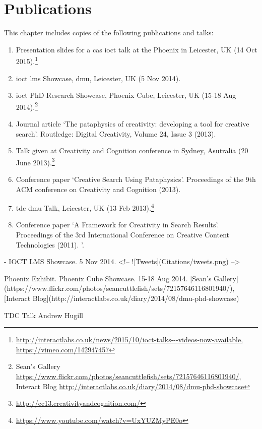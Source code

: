 
\chapter{Publications}
\label{app:pub}

This chapter includes copies of the following publications and talks:


\begin{enumerate}
  \item Presentation slides for a \gls{cas} \gls{ioct} talk at the Phoenix in Leicester, UK (14 Oct 2015).\footnote{\url{http://interactlabs.co.uk/news/2015/10/ioct-talks---videos-now-available}, \url{https://vimeo.com/142947457}}
  \item \gls{ioct} \gls{lms} Showcase, \gls{dmu}, Leicester, UK (5 Nov 2014).
  \item \gls{ioct} PhD Research Showcase, Phoenix Cube, Leicester, UK (15-18 Aug 2014).\footnote{Sean's Gallery \url{https://www.flickr.com/photos/seancuttlefish/sets/72157646116801940/}, Interact Blog \url{http://interactlabs.co.uk/diary/2014/08/dmu-phd-showcase}}
  \item Journal article `The pataphysics of creativity: developing a tool for creative search'. Routledge: Digital Creativity, Volume 24, Issue 3 (2013).
  \item Talk given at Creativity and Cognition conference in Sydney, Asutralia (20 June 2013).\footnote{\url{http://cc13.creativityandcognition.com/}}
  \item Conference paper `Creative Search Using Pataphysics'. Proceedings of the 9th ACM conference on Creativity and Cognition (2013).
  \item \gls{tdc} \gls{dmu} Talk, Leicester, UK (13 Feb 2013).\footnote{\url{https://www.youtube.com/watch?v=UxYUZMyPE0o}}
  \item Conference paper `A Framework for Creativity in Search Results'. Proceedings of the 3rd International Conference on Creative Content Technologies (2011).
'.
\end{enumerate}



- IOCT LMS Showcase. 5 Nov 2014.
<!-- ![Tweets](Citations/tweets.png) -->
\newpage

Phoenix Exhibit.
Phoenix Cube Showcase. 15-18 Aug 2014. [Sean's Gallery](https://www.flickr.com/photos/seancuttlefish/sets/72157646116801940/), [Interact Blog](http://interactlabs.co.uk/diary/2014/08/dmu-phd-showcase)
\newpage







TDC Talk Andrew Hugill
\newpage



